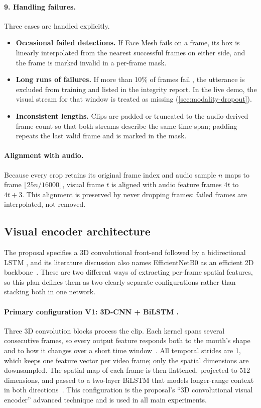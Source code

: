 \paragraph{9. Handling failures.} Three cases are handled explicitly.
\begin{itemize}
  \item \textbf{Occasional failed detections.} If Face Mesh fails on a frame,
        its box is linearly interpolated from the nearest successful frames on
        either side, and the frame is marked invalid in a per-frame mask.
  \item \textbf{Long runs of failures.} If more than 10\% of frames fail
        \rec, the utterance is excluded from training and listed in the
        integrity report. In the live demo, the visual stream for that window
        is treated as missing (\cref{sec:modality-dropout}).
  \item \textbf{Inconsistent lengths.} Clips are padded or truncated to the
        audio-derived frame count so that both streams describe the same time
        span; padding repeats the last valid frame and is marked in the mask.
\end{itemize}

\paragraph{Alignment with audio.} Because every crop retains its original frame
index and audio sample $n$ maps to frame $\lfloor 25n/16000\rfloor$, visual
frame $t$ is aligned with audio feature frames $4t$ to $4t+3$. This alignment
is preserved by never dropping frames: failed frames are interpolated, not
removed.

\subsection{Visual encoder architecture}
\label{sec:visual-encoder}
The proposal specifies a 3D convolutional front-end followed by a
bidirectional LSTM \spec, and its literature discussion also names
EfficientNetB0 as an efficient 2D backbone~\cite{kanavnet2026,ameer2025}. These
are two different ways of extracting per-frame spatial features, so this plan
defines them as two clearly separate configurations rather than stacking both
in one network.

\paragraph{Primary configuration V1: 3D-CNN + BiLSTM \rec.}
Three 3D convolution blocks process the clip. Each kernel spans several
consecutive frames, so every output feature responds both to the mouth's shape
and to how it changes over a short time window~\cite{lipsyncnet2024,assael2016}.
All temporal strides are 1, which keeps one feature vector per video frame;
only the spatial dimensions are downsampled. The spatial map of each frame is
then flattened, projected to 512 dimensions, and passed to a two-layer BiLSTM
that models longer-range context in both directions~\cite{kanavnet2026}. This
configuration is the proposal's ``3D convolutional visual encoder'' advanced
technique and is used in all main experiments.

